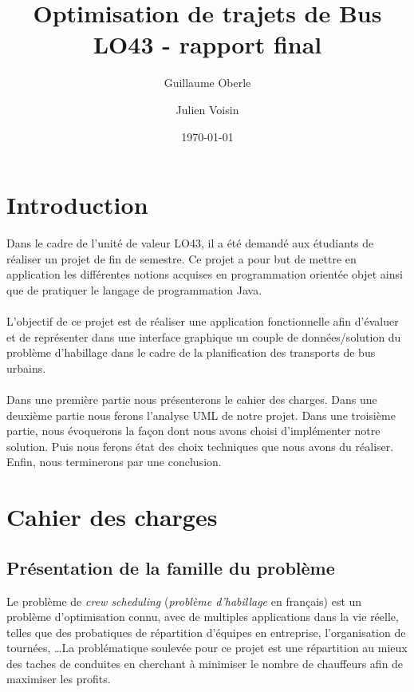 \documentclass[12pt]{article}
\title{Optimisation de trajets de Bus\\
\small LO43 - rapport final}
\author{Guillaume Oberle \and Julien Voisin}
\date{\today{}}
\begin{document}


\maketitle

\tableofcontents
\newpage

\section*{Introduction}
Dans le cadre de l’unité de valeur LO43, il a été demandé aux étudiants de réaliser un projet de fin de semestre. Ce projet a pour but de mettre en application les différentes notions acquises en programmation orientée objet ainsi que de pratiquer le langage de programmation Java.
\paragraph{}
L'objectif de ce projet est de réaliser une application fonctionnelle afin d'évaluer et de représenter dans une interface graphique un couple de données/solution du problème d'habillage dans le cadre de la planification des transports de bus urbains.
\paragraph{}
Dans une première partie nous présenterons le cahier des charges. Dans une deuxième partie nous ferons l'analyse UML de notre projet. Dans une troisième partie, nous évoquerons la façon dont nous avons choisi d'implémenter notre solution. Puis nous ferons état des choix techniques que nous avons du réaliser. Enfin, nous terminerons par une conclusion.

\newpage
\section{Cahier des charges}
\subsection{Présentation de la famille du problème}
Le problème de \emph{crew scheduling} (\emph{problème d'habillage} en français) est un problème d'optimisation connu, avec de multiples applications dans la vie réelle, telles que des probatiques de répartition d'équipes en entreprise, l'organisation de tournées, \dots La problématique soulevée pour ce projet est une répartition au mieux des taches de conduites en cherchant à minimiser le nombre de chauffeurs afin de maximiser les profits. 
\end{document}
